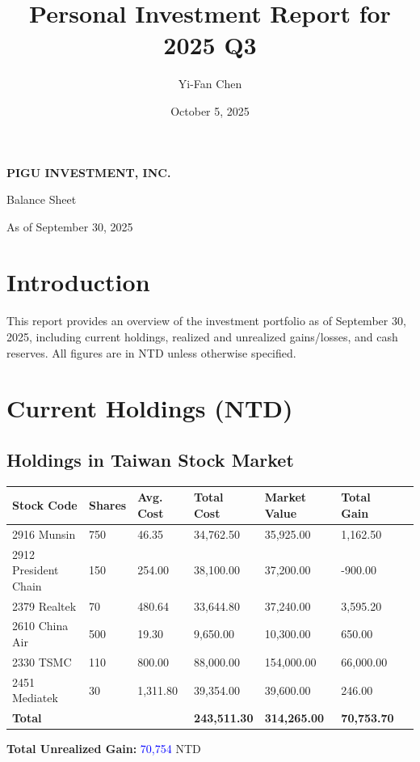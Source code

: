 \documentclass[a4paper,12pt]{article}
\title{\textbf{Personal Investment Report for 2025 Q3}}
\author{Yi-Fan Chen}
\date{October 5, 2025}
\begin{document}
\begin{titlepage}
    \centering
    \vspace*{\fill}
    {\Huge \textbf{PIGU INVESTMENT, INC.} \par}
    \vspace{1.5cm}
    {\LARGE Balance Sheet \par}
    \vspace{2cm}
    {\Large As of September 30, 2025 \par}
    \vspace*{\fill}
\end{titlepage}

\section{Introduction}
This report provides an overview of the investment portfolio as of September 30, 2025, including current holdings, realized and unrealized gains/losses, and cash reserves. All figures are in NTD unless otherwise specified.

\section{Current Holdings (NTD)} 
\subsection{Holdings in Taiwan Stock Market}
\begin{longtable}{lllllll}
    \toprule
    Stock Code & Shares & Avg. Cost & Total Cost & Market Value & Total Gain \\
    \midrule
    2916 Munsin       & 750  & 46.35     & 34,762.50 & 35,925.00  & 1,162.50 \\
    2912 President Chain & 150 & 254.00   & 38,100.00 & 37,200.00  & -900.00  \\
    2379 Realtek      & 70   & 480.64   & 33,644.80 & 37,240.00  & 3,595.20 \\
    2610 China Air    & 500  & 19.30     & 9,650.00  & 10,300.00  & 650.00   \\
    2330 TSMC         & 110  & 800.00  & 88,000.00 & 154,000.00 & 66,000.00 \\
    2451 Mediatek     & 30   & 1,311.80  & 39,354.00 & 39,600.00  & 246.00   \\
    \midrule
    \textbf{Total} &      &         & \textbf{243,511.30} & \textbf{314,265.00} & \textbf{70,753.70} \\
    \bottomrule
\end{longtable}
\noindent\textbf{Total Unrealized Gain:} \textcolor{blue}{70,754} NTD
\end{document}
